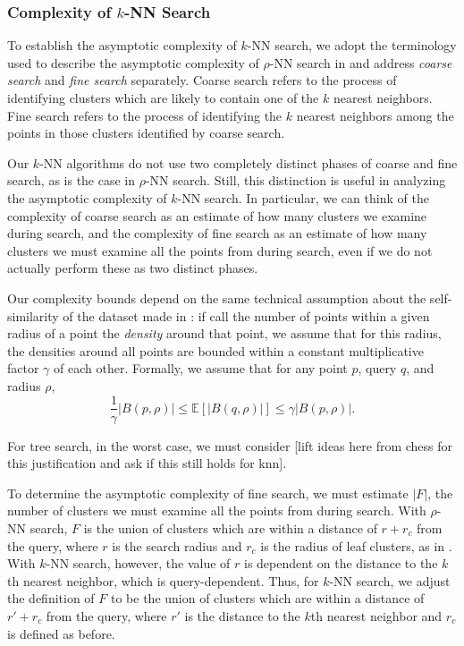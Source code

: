 \subsubsection{Complexity of $k$-NN Search}
\label{paragraph:methods:knn-complexity}
To establish the asymptotic complexity of $k$-NN search, we adopt 
the terminology used to describe the asymptotic complexity of $\rho$-NN search 
in \cite{yu2015entropy}
and address \emph{coarse search} and \emph{fine search} separately. 
Coarse search refers to the process of identifying clusters
which are likely to contain one of the $k$ nearest neighbors. Fine search refers to the process
of identifying the $k$ nearest neighbors among the points in those clusters identified by coarse search.


Our $k$-NN algorithms do not use two completely distinct phases of coarse and fine search, 
as is the case in $\rho$-NN search. Still, this distinction is useful in analyzing 
the asymptotic complexity of $k$-NN search. In particular, we can think of the complexity of 
coarse search as an estimate of how many clusters we examine during search, and 
the complexity of fine search as an estimate of how many clusters we must examine all the points 
from during search, even if we do not actually perform these as two distinct phases. 


Our complexity bounds depend on the same technical assumption about the self-similarity of the dataset made in 
\cite{yu2015entropy}: if call the number of points within a given 
radius of a point the \emph{density} around that point, we assume that for this radius, the densities around all points
are bounded within a constant multiplicative factor $\gamma$ of each other. Formally, 
we assume that for any point $p$, query $q$, and radius 
$\rho$, \begin{equation} \frac{1}{\gamma}|B(p, \rho)| \leq \mathbb{E}[|B(q, \rho)|] \leq \gamma |B(p, \rho)|. \label{3} \end{equation}

For tree search, in the worst case, we must consider [lift ideas here from chess for this justification and ask 
if this still holds for knn]. 

To determine the asymptotic complexity of fine search, we must estimate $|F|$, the 
number of clusters we must examine all the points from during search. With $\rho$-NN 
search, $F$ is the union of clusters which are within a distance of $r + r_c$ from the query,
where $r$ is the search radius and $r_c$ is the radius of leaf clusters,
as in \cite{yu2015entropy}. With $k$-NN search, however, 
the value of $r$ is dependent on the distance to the $k$th nearest neighbor, which 
is query-dependent. Thus, for $k$-NN search, we  adjust the definition of 
$F$ to be the union of clusters which are within a distance of $r' + r_c$ from the query, 
where $r'$ is the distance to the $k$th nearest neighbor and $r_c$ is defined as before.

